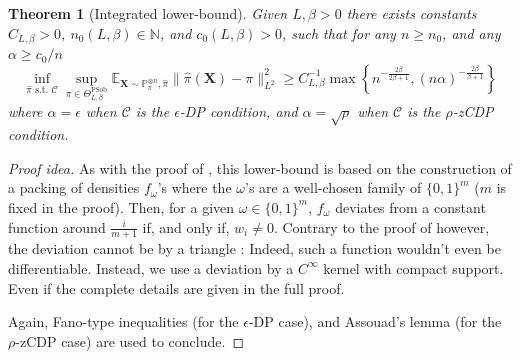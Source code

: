 \documentclass[10pt]{article} %
\newtheorem{theorem}{Theorem}
\newcommand{\N}[0]{\mathbb{N}}
\newcommand{\Prob}[0]{\mathbb{P}}
\newcommand{\E}[0]{\mathbb{E}}
\newcommand\vect[1]{\mathbf{#1}}
\newcommand\p[1]{\left( {#1}\right)}
\begin{document}
\begin{theorem}[Integrated lower-bound]
\label{th:sidp}
Given $L,\beta>0$ there exists constants
$C_{L, \beta}>0$,
$n_0(L, \beta) \in \N$, and $c_0(L, \beta) > 0$, such that for any $n \geq n_0$, and any $\alpha \geq c_0/n$ %
\begin{equation*}
    \inf_{\hat{\pi} \text{ s.t. } \mathcal{C}} \sup_{\pi \in \Theta^{\text{PSob}}_{L, \beta}}
    \E_{\vect{X} \sim \Prob_{\pi}^{\otimes n}, \hat{\pi}}\|\hat{\pi}(\vect{X})- \pi\|_{L^2}^2 \geq  C_{L, \beta}^{-1} \max \left\{ n^{-\frac{2 \beta}{2 \beta + 1}}, (n \alpha)^{-\frac{2 \beta}{\beta + 1}} \right\}
\end{equation*}
where $\alpha=\epsilon$
when $\mathcal{C}$ is the $\epsilon$-DP condition, and 
$\alpha=\sqrt{\rho}$ when $\mathcal{C}$ is the $\rho$-zCDP condition.
\end{theorem}

\begin{proof}[Proof idea]
As with the proof of , this lower-bound is based on the construction of a packing of densities $f_{\omega}$'s where the $\omega$'s are a well-chosen family of $\{ 0, 1 \}^m$ ($m$ is fixed in the proof). Then, for a given  $\omega \in \{ 0, 1 \}^m$, $f_{\omega}$ deviates from a constant function around $\frac{i}{m+1}$ if, and only if, %
$w_i \neq 0$. 
Contrary to the proof of  however, the deviation cannot be by a triangle : Indeed, such a function wouldn't even be differentiable. Instead, we use a deviation by a $C^\infty$ kernel with compact support. Even if the complete details are given in the full proof.%

Again, Fano-type inequalities (for the $\epsilon$-DP case), and Assouad's lemma (for the $\rho$-zCDP case) are used to conclude.
\end{proof}
\end{document}
